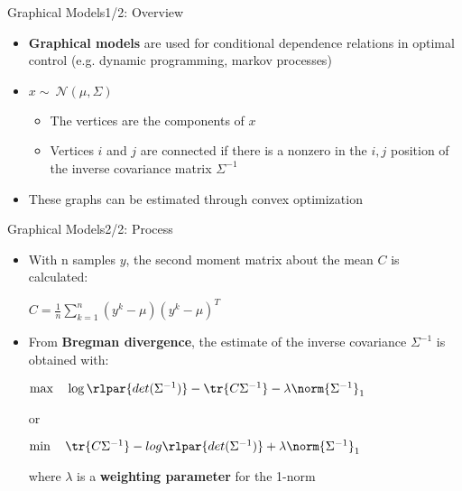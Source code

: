 
\begin{frame}{Graphical Models}{1/2: Overview \ \ \cite{vandenberghe2012convex}}
\begin{itemize}
    \item \textbf{Graphical models} are used for conditional dependence relations in optimal control (e.g. dynamic programming, markov processes)
    \item \(x \sim{~} \mathcal{N}(\mu,\Sigma)  \)
    \begin{itemize}
        \item The vertices are the components of \(x\)
        \item Vertices \(i\) and \(j\) are connected if there is a nonzero in the \(i,j\) position of the inverse covariance matrix \(\Sigma^{-1}\)
    \end{itemize}
    \item These graphs can be estimated through {\bor convex optimization}
\end{itemize}
\end{frame}


\begin{frame}{Graphical Models}{2/2: Process \ \ \cite{vandenberghe2012convex, ravikumar2008highdimensional}}
\begin{itemize}
    \item With n samples \(y\), the second moment matrix about the mean \(C\) is calculated:\\
    \begin{center}
        \(C = \frac{1}{n}\sum_{k=1}^{n}(y^{k}-\mu)(y^{k}-\mu)^T\)
    \end{center}
    \item From \textbf{Bregman divergence}, the estimate of the inverse covariance \(\Sigma^{-1}\) is obtained with:\\
    \begin{center}
        \( \max \quad \log\rlpar{det(\Sigma^{-1})} - \tr{C\Sigma^{-1}}-\lambda \norm{\Sigma^{-1}}_1\)\\
     \end{center}
        or\\
     \begin{center}
        \(\min \quad \tr{C\Sigma^{-1}} - log\rlpar{det(\Sigma^{-1})} +\lambda \norm{\Sigma^{-1}}_1\)\\
     \end{center}
     where $\lambda$ is a \textbf{weighting parameter} for the 1-norm
\end{itemize}
\end{frame}


